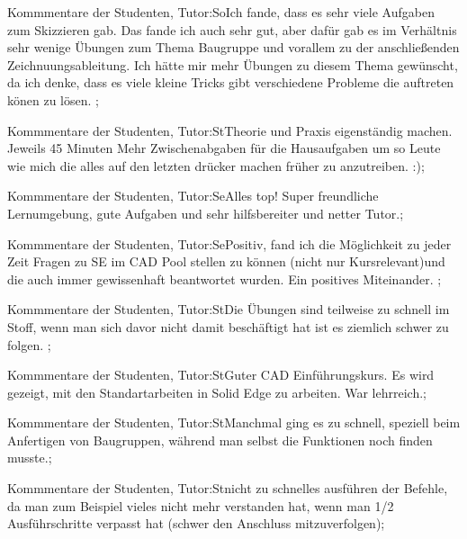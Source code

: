 \documentclass[10pt]{beamer}
\begin{document}
\begin{frame}[fragile]{Kommmentare der Studenten, Tutor:So}Ich fande, dass es sehr viele Aufgaben zum Skizzieren gab. Das fande ich auch sehr gut, aber dafür gab es im Verhältnis sehr wenige Übungen zum Thema Baugruppe und vorallem zu der anschließenden Zeichnuungsableitung. Ich hätte mir mehr Übungen zu diesem Thema gewünscht, da ich denke, dass es viele kleine Tricks gibt verschiedene Probleme die auftreten könen zu lösen. ;
 \end{frame}
\begin{frame}[fragile]{Kommmentare der Studenten, Tutor:St}Theorie und Praxis eigenständig machen.  Jeweils 45 Minuten   Mehr Zwischenabgaben für die Hausaufgaben um so Leute wie mich die alles auf den letzten drücker machen früher zu anzutreiben. :);
 \end{frame}
\begin{frame}[fragile]{Kommmentare der Studenten, Tutor:Se}Alles top! Super freundliche Lernumgebung, gute Aufgaben und sehr hilfsbereiter und netter Tutor.;
 \end{frame}
\begin{frame}[fragile]{Kommmentare der Studenten, Tutor:Se}Positiv, fand ich die Möglichkeit zu jeder Zeit Fragen zu SE im CAD Pool stellen zu können (nicht nur Kursrelevant)und die auch immer gewissenhaft beantwortet wurden.
 Ein positives Miteinander. ;
 \end{frame}
\begin{frame}[fragile]{Kommmentare der Studenten, Tutor:St}Die Übungen sind teilweise zu schnell im Stoff, wenn man sich davor nicht damit beschäftigt hat ist es ziemlich schwer zu folgen. ;
 \end{frame}
\begin{frame}[fragile]{Kommmentare der Studenten, Tutor:St}Guter CAD Einführungskurs. Es wird gezeigt, mit den Standartarbeiten in Solid Edge zu arbeiten. War lehrreich.;
 \end{frame}
\begin{frame}[fragile]{Kommmentare der Studenten, Tutor:St}Manchmal ging es zu schnell, speziell beim Anfertigen von Baugruppen, während man selbst die Funktionen noch finden musste.;
 \end{frame}
\begin{frame}[fragile]{Kommmentare der Studenten, Tutor:St}nicht zu schnelles ausführen der Befehle, da man zum Beispiel vieles nicht mehr verstanden hat, wenn man 1/2 Ausführschritte verpasst hat (schwer den Anschluss mitzuverfolgen);
 \end{frame}
\end{document}
